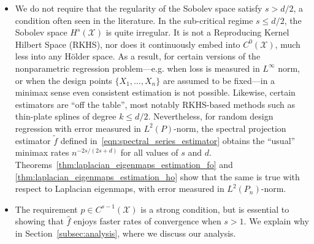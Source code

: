 \documentclass{article}
\newcommand{\1}{\mathbf{1}}
\newcommand{\Leb}{L}
\newcommand{\mc}[1]{\mathcal{#1}}
\newcommand{\wt}[1]{\widetilde{#1}}
\newcommand{\wh}[1]{\widehat{#1}}
\theoremstyle{alden}
\theoremstyle{aldenthm}
\theoremstyle{definition}
\theoremstyle{remark}
\begin{document}
\begin{itemize}
	\item We do not require that the regularity of the Sobolev space satisfy $s > d/2$, a condition often seen in the literature. In the sub-critical regime $s \leq d/2$, the Sobolev space $H^s(\mc{X})$ is quite irregular. It is not a Reproducing Kernel Hilbert Space (RKHS), nor does it continuously embed into $C^0(\mc{X})$, much less into any H\"{o}lder space. As a result, for certain versions of the nonparametric regression problem---e.g. when loss is measured in $\Leb^{\infty}$ norm, or when the design points $\{X_1,\ldots,X_n\}$ are assumed to be fixed---in a minimax sense even consistent estimation is not possible. Likewise, certain estimators are ``off the table'', most notably RKHS-based methods such as thin-plate splines of degree $k \leq d/2$. Nevertheless, for random design regression with error measured in $\Leb^2(P)$-norm, the spectral projection estimator $\wt{f}$ defined in~\eqref{eqn:spectral_series_estimator} obtains the ``usual'' minimax rates $n^{-2s/(2s + d)}$ for all values of $s$ and $d$. Theorems~\ref{thm:laplacian_eigenmaps_estimation_fo} and \ref{thm:laplacian_eigenmaps_estimation_ho} show that the same is true with respect to Laplacian eigenmaps, with error measured in $\Leb^2(P_n)$-norm.
	\item The requirement $p \in C^{s - 1}(\mc{X})$ is a strong condition, but is essential to showing that $\wh{f}$ enjoys faster rates of convergence when $s > 1$. We explain why in Section~\ref{subsec:analysis}, where we discuss our analysis.
\end{itemize}
\end{document}

